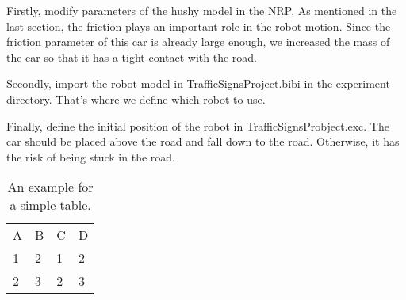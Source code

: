 Firstly, modify parameters of the hushy model in the NRP. As mentioned in the last section, the friction plays an important role in the robot motion. Since the friction parameter of this car is already large enough, we increased the mass of the car so that it has a tight contact with the road.


Secondly, import the robot model in TrafficSignsProject.bibi in the experiment directory. That's where we define which robot to use.


Finally, define the initial position of the robot in TrafficSignsProbject.exc. The car should be placed above the road and fall down to the road. Otherwise, it has the risk of being stuck in the road.


\begin{table}[htpb]
	\caption[Example table]{An example for a simple table.}\label{tab:sampleA}
	\centering
	\begin{tabular}{l l l l}
		A & B & C & D \\
		\cline{1-4}	
		1 & 2 & 1 & 2 \\
		2 & 3 & 2 & 3 \\
	\end{tabular}
\end{table}



